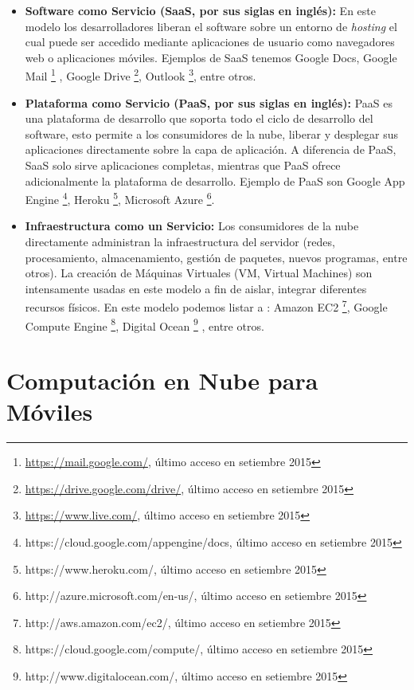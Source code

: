 \begin{itemize}
 \item \textbf{Software como Servicio (SaaS, por sus siglas en inglés):} En este modelo los desarrolladores liberan el software sobre un entorno de \textit{hosting}
 el cual puede ser accedido mediante aplicaciones de usuario como navegadores web o aplicaciones móviles. Ejemplos de SaaS tenemos Google Docs,
 Google Mail \footnote{\url{https://mail.google.com/}, último acceso en setiembre 2015} , 
 Google Drive \footnote{\url{https://drive.google.com/drive/}, último acceso en setiembre 2015}, 
 Outlook \footnote{\url{https://www.live.com/}, último acceso en setiembre 2015}, entre otros.
 
 \item \textbf{Plataforma como Servicio (PaaS, por sus siglas en inglés): } PaaS es una plataforma de desarrollo que soporta todo el ciclo de 
 desarrollo del software, esto permite a los consumidores de la nube, liberar y desplegar sus aplicaciones directamente sobre la capa de 
 aplicación. A diferencia de PaaS, SaaS solo sirve aplicaciones completas, mientras que PaaS ofrece adicionalmente la plataforma de desarrollo.
 Ejemplo de PaaS son Google App Engine \footnote{https://cloud.google.com/appengine/docs, último acceso en setiembre 2015}, 
 Heroku \footnote{https://www.heroku.com/, último acceso en setiembre 2015}, 
 Microsoft Azure \footnote{http://azure.microsoft.com/en-us/, último acceso en setiembre 2015}.
 
 \item \textbf{Infraestructura como un Servicio:} Los consumidores de la nube directamente administran la infraestructura del servidor (redes,
 procesamiento, almacenamiento, gestión de paquetes, nuevos programas, entre otros). La creación de Máquinas Virtuales (VM, Virtual Machines) 
 son intensamente usadas en este modelo a fin de aislar, integrar diferentes recursos físicos. En este modelo podemos listar a :
 Amazon EC2 \footnote{http://aws.amazon.com/ec2/, último acceso en setiembre 2015}, Google Compute Engine
 \footnote{https://cloud.google.com/compute/, último acceso en setiembre 2015}, Digital Ocean 
 \footnote{http://www.digitalocean.com/, último acceso en setiembre 2015} , entre otros.
\end{itemize}




\section{Computación en Nube para Móviles} %

